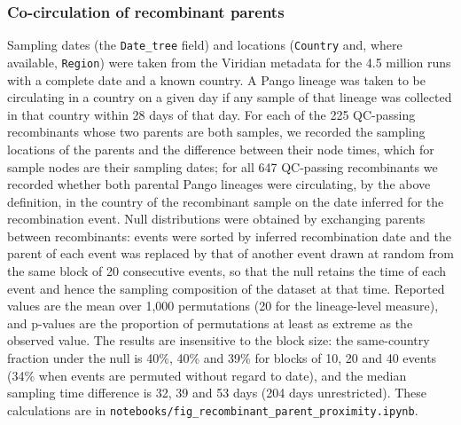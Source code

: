 \documentclass[12pt]{article}
\begin{document}
\subsubsection*{Co-circulation of recombinant parents}
Sampling dates (the \texttt{Date\_tree} field) and locations
(\texttt{Country} and, where available, \texttt{Region})
were taken from the Viridian metadata for the 4.5 million runs
with a complete date and a known country.
A Pango lineage was taken to be circulating in a country on a given day
if any sample of that lineage was collected in that country
within 28 days of that day.
For each of the 225 QC-passing recombinants
whose two parents are both samples,
we recorded the sampling locations of the parents
and the difference between their node times,
which for sample nodes are their sampling dates;
for all 647 QC-passing recombinants we recorded whether
both parental Pango lineages were circulating,
by the above definition, in the country of the recombinant sample
on the date inferred for the recombination event.
Null distributions were obtained by exchanging parents between recombinants:
events were sorted by inferred recombination date
and the parent of each event was replaced by that of another event
drawn at random from the same block of 20 consecutive events,
so that the null retains the time of each event
and hence the sampling composition of the dataset at that time.
Reported values are the mean over 1,000 permutations
(20 for the lineage-level measure),
and p-values are the proportion of permutations
at least as extreme as the observed value.
The results are insensitive to the block size:
the same-country fraction under the null is
40\%, 40\% and 39\% for blocks of 10, 20 and 40 events
(34\% when events are permuted without regard to date),
and the median sampling time difference is
32, 39 and 53 days (204 days unrestricted).
These calculations are in
\texttt{notebooks/fig\_recombinant\_parent\_proximity.ipynb}.
\end{document}
